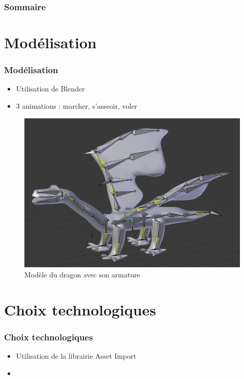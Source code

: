 \documentclass[10pt]{beamer}
\begin{document}

\begin{frame}
 	\frametitle{Sommaire}
	\tableofcontents
\end{frame}

\section{Modélisation}
\begin{frame}
\frametitle{Modélisation}
\begin{itemize}
    \item Utilisation de Blender
    \item 3 animations : marcher, s'asseoir, voler
\end{itemize}
\begin{figure}[htpb]
    \centering
    \includegraphics[width=0.7\linewidth]{armature.png}
    \caption{Modèle du dragon avec son armature}
\end{figure}
\end{frame}

\section{Choix technologiques}
\begin{frame}
\frametitle{Choix technologiques}
\begin{itemize}
    \item Utilisation de la librairie Asset Import
    \item %
\end{itemize}
\end{frame}
\end{document}
